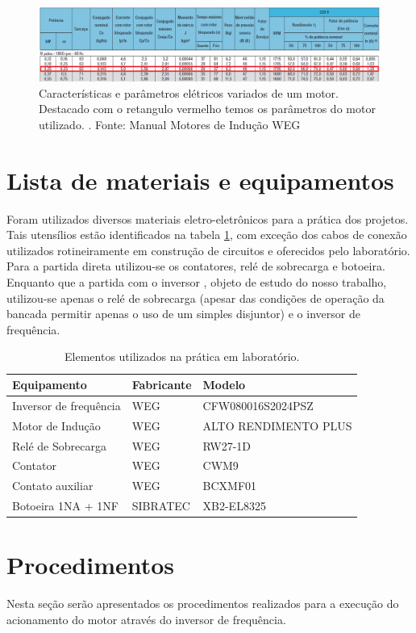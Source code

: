 \documentclass[a4paper, 12pt,oneside, english, brazil]{abntex2}
\begin{document}
\begin{figure}[H]
    \centering
    \includegraphics[scale=0.45]{tabelinhaaa.png}
    \caption{Características e parâmetros elétricos variados de um motor. Destacado com o retangulo vermelho temos os parâmetros do motor utilizado.
. Fonte: Manual Motores de Indução WEG}
    \label{tab}
\end{figure}
\newpage

\section{Lista de materiais e equipamentos}

Foram utilizados diversos materiais eletro-eletrônicos para a prática dos projetos. Tais utensílios estão identificados na tabela \ref{uten}, com exceção dos cabos de conexão utilizados rotineiramente em construção de circuitos e oferecidos pelo laboratório. Para a partida direta utilizou-se os contatores, relé de sobrecarga e botoeira. Enquanto que a partida com o inversor , objeto de estudo do nosso trabalho, utilizou-se apenas o relé de sobrecarga (apesar das condições de operação da bancada permitir apenas o uso de um simples disjuntor) e o inversor de frequência.

\begin{table}[H]
\centering
\begin{tabular}{|l|l|l|}
\hline
Equipamento     & Fabricante  & Modelo \\\hline
Inversor de frequência & WEG & CFW080016S2024PSZ \\\hline
Motor de Indução & WEG & ALTO RENDIMENTO PLUS \\\hline
Relé de Sobrecarga & WEG & RW27-1D \\\hline
Contator & WEG & CWM9 \\\hline
Contato auxiliar & WEG & BCXMF01  \\\hline 
Botoeira 1NA + 1NF &SIBRATEC & XB2-EL8325 \\\hline
\end{tabular}
\caption{ Elementos utilizados na prática em laboratório. }
\label{uten}
\end{table}

 
\section{Procedimentos}
Nesta seção serão apresentados os procedimentos realizados para a execução do acionamento do motor através do inversor de frequência.
\end{document}
